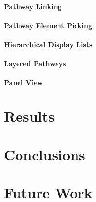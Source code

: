 \subsubsection{Pathway Linking}
\subsubsection{Pathway Element Picking}
\subsubsection{Hierarchical Display Lists}
\subsubsection{Layered Pathways}
\subsubsection{Panel View}

\chapter{Results}


\chapter{Conclusions}

\chapter{Future Work}



